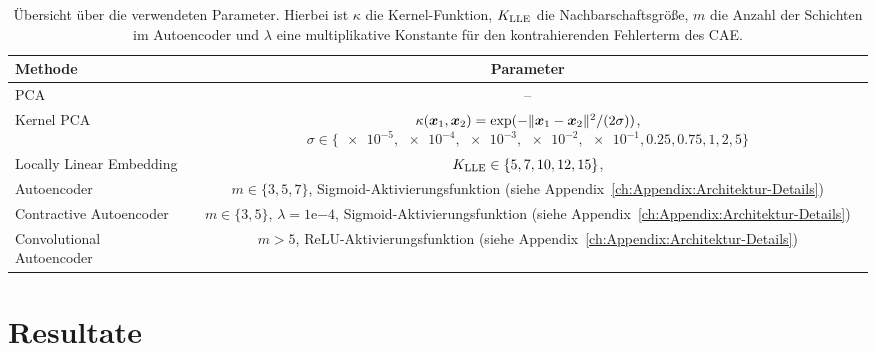 \begin{table}[ht]
	\tymax=300pt
	\centering
	\begin{tabulary}{\textwidth}{LC}
		\toprule
		Methode                            & Parameter                                                            \\ \midrule
		PCA      & --                                                                   \\
		Kernel PCA                         & $\kappa(\bm{x}_1, \bm{x}_2) = \exp(- \lVert\bm{x}_1 - \bm{x}_2\rVert^2/(2\sigma))$, $\sigma \in \{\num{e-5},\num{e-4}, \num{e-3}, \num{e-2}, \num{e-1}, 0.25, 0.75, 1, 2, 5\}$ \\
		Locally Linear Embedding     & $K_{\text{LLE}} \in \{ 5, 7, 10, 12, 15\}$,                      \\
		Autoencoder                  & $m \in \{3, 5, 7\}$, Sigmoid-Aktivierungsfunktion \newline (siehe
		Appendix~\ref{ch:Appendix:Architektur-Details})                                                           \\  Contractive Autoencoder & $m \in \{3, 5\}$, $\lambda=1\mathrm{e}{-4}$,
		Sigmoid-Aktivierungsfunktion (siehe Appendix~\ref{ch:Appendix:Architektur-Details})                       \\
		Convolutional Autoencoder & $m > 5$, ReLU-Aktivierungsfunktion \newline (siehe
		Appendix~\ref{ch:Appendix:Architektur-Details})                                                           \\ \bottomrule
	\end{tabulary}
	\caption[Übersicht über die verwendeten Parameter der Methoden]{Übersicht über die verwendeten Parameter. Hierbei ist $\kappa$ die Kernel-Funktion, $K_{\text{LLE}}$ die Nachbarschaftsgröße, $m$ die Anzahl der Schichten im Autoencoder und $\lambda$ eine multiplikative Konstante für den kontrahierenden Fehlerterm des CAE.}
	\label{tab:uebersicht-parameter}
\end{table}
\section{Resultate}
\label{ch:Vergleich:sec:Resultate}


